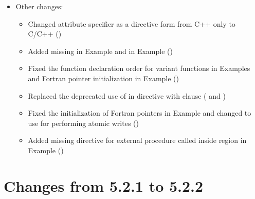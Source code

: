 \begin{itemize}
\item Other changes:
\begin{itemize}
  \item Changed attribute specifier as a directive form from C++ only to C/C++
    ()
  \item Added missing  in Example 
    and  in Example 
    ()
  \item Fixed the function declaration order for variant functions in
    Examples  and Fortran pointer
    initialization in Example 
    ()
  \item Replaced the deprecated use of  
    in  directive with  clause
    ( and )
  \item Fixed the initialization of Fortran pointers 
    in Example  and changed to
    use  for performing atomic writes
    ()
  \item Added missing  directive for external procedure
    called inside  region in Example 
     ()
\end{itemize}

\end{itemize}

\section{Changes from 5.2.1 to 5.2.2}
\label{sec:history_521_to_522}

